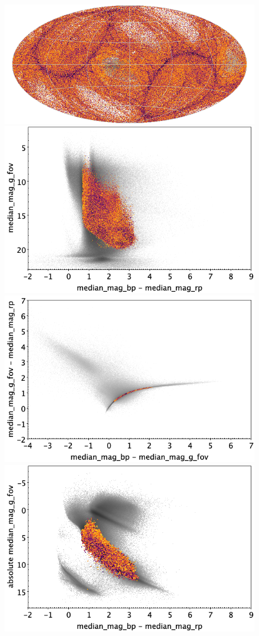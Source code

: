 \documentclass[longauth]{aa}
\begin{document}
\begin{appendix}
\begin{figure}
\centering
{}
\includegraphics[width=0.6\hsize]{figures/appendix/SOLAR_cls_sky.png} 
 \\ %
\vspace{4mm}
 \includegraphics[width=0.45\hsize]{figures/appendix/SOLAR_cls_cm.png}  %
\hspace{2mm}
 \includegraphics[width=0.45\hsize]{figures/appendix/SOLAR_cls_cc.png} \\ %
\vspace{4mm}
 \includegraphics[width=0.45\hsize]{figures/appendix/SOLAR_cls_cam.png}  %

\end{figure}
\end{appendix}
\end{document}
